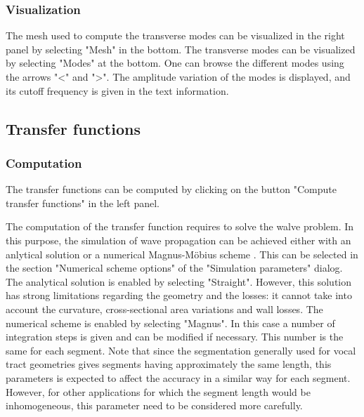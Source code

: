 \documentclass[]{article}
\begin{document}
	\subsubsection{Visualization}
	
	The mesh used to compute the transverse modes can be visualized
	in the right panel by selecting "Mesh" in the bottom.
	The transverse modes can be visualized by 
	selecting "Modes" at the bottom. 
	One can browse the different modes using the arrows "<" and ">".
	The amplitude variation of the modes is displayed, and its cutoff 
	frequency is given in the text information.
	
	\subsection{Transfer functions}
	
	\subsubsection{Computation}
	
	The transfer functions can be computed by clicking on the button 
	"Compute transfer functions" in the left panel.
	
	The computation of the transfer function requires to solve the 
	walve problem. In this purpose, the simulation of wave propagation can be achieved either with an anlytical 
	solution \cite{blandin2015effects} or a numerical Magnus-Möbius 
	scheme \cite{PAGNEUX20101834}.
	This can be selected in the section "Numerical scheme options" of
	the "Simulation parameters" dialog. The analytical solution is 
	enabled by selecting "Straight". However, this solution has strong limitations regarding the geometry and the losses: it cannot take into account the curvature, cross-sectional area variations and 
	wall losses. The numerical scheme is enabled by selecting "Magnus".
	In this case a number of integration steps is given and can be 
	modified if necessary. This number is the same for each segment.
	Note that since the segmentation generally used for vocal tract geometries gives segments having approximately the same length, 
	this parameters is expected to affect the accuracy in a similar way
	for each segment. However, for other applications for which the 
	segment length would be inhomogeneous, this parameter need to be considered more carefully.
	
\end{document}
